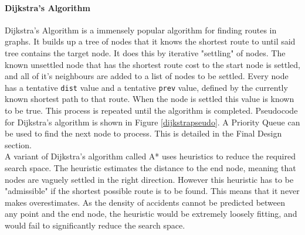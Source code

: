\documentclass[11pt,twoside,a4paper]{report}
\begin{document}
\paragraph{Dijkstra's Algorithm}
Dijkstra's Algorithm\cite{Dijkstra1959} is a immensely popular algorithm for finding routes in graphs. It builds up a tree of nodes that it knows the shortest route to until said tree contains the target node. It does this by iterative "settling" of nodes.
The known unsettled node that has the shortest route cost to the start node is settled, and all of it's neighbours are added to a list of nodes to be settled. Every node has a tentative \texttt{dist} value and a tentative \texttt{prev} value, defined by the currently known shortest path to that route.
When the node is settled this value is known to be true. This process is repeated until the algorithm is completed. Pseudocode for Dijkstra's algorithm is shown in Figure \ref{dijkstrapseudo}. A Priority Queue can be used to find the next node to process. This is detailed in the Final Design section.
\\A variant of Dijkstra's algorithm called A*\cite{Hart1968} uses heuristics to reduce the required search space. The heuristic estimates the distance to the end node, meaning that nodes are vaguely settled in the right direction.
However this heuristic has to be "admissible" if the shortest possible route is to be found. This means that it never makes overestimates. As the density of accidents cannot be predicted between any point and the end node, the heuristic would be extremely loosely fitting, and would 
fail to significantly reduce the search space. 
\end{document}
